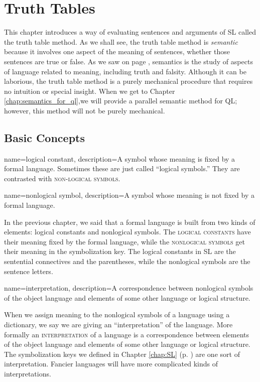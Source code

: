 \chapter{Truth Tables}\label{ch:truth_tables}

This chapter introduces a way of evaluating sentences and arguments of SL called the truth table method. As we shall see, the truth table method is \emph{semantic} because it involves one aspect of the meaning of sentences, whether those sentences are true or false. As we saw on page \pageref{def:semantics}, semantics is the study of aspects of language related to meaning, including truth and falsity. Although it can be laborious, the truth table method is a purely mechanical procedure that requires no intuition or special insight. When we get to Chapter \ref{chap:semantics_for_ql},we will provide a parallel semantic method for QL; however, this method will not be purely mechanical.

\section{Basic Concepts}

{
name=logical constant,
description={A symbol whose meaning is fixed by a formal language. Sometimes these are just called ``logical symbols.'' They are contrasted with \textsc{non-logical symbols}.}
}

{
name=nonlogical symbol,
description={A symbol whose meaning is not fixed by a formal language.}
}



In the previous chapter, we said that a formal language is built from two kinds of elements: logical constants and nonlogical symbols. The \textsc{\glspl{logical constant}}\label{def:logical_constant} have their meaning fixed by the formal language, while the \textsc{\glspl{nonlogical symbol}} \label{def:nonlogical_symbol} get their meaning in the symbolization key. The logical constants in SL are the sentential connectives and the parentheses, while the nonlogical symbols are the sentence letters.

{
name=interpretation,
description={A correspondence between nonlogical symbols of the object language and elements of some other language or logical structure.}
}

When we assign meaning to the nonlogical symbols of a language using a dictionary, we say we are giving an ``interpretation'' of the language. More formally an \textsc{\gls{interpretation}\label{def:interpretation}} of a language is a correspondence between elements of the object language and elements of some other language or logical structure. The symbolization keys we defined in Chapter \ref{chap:SL} (p. \pageref{def:translation_key}) are one sort of interpretation. Fancier languages will have more complicated kinds of interpretations.

